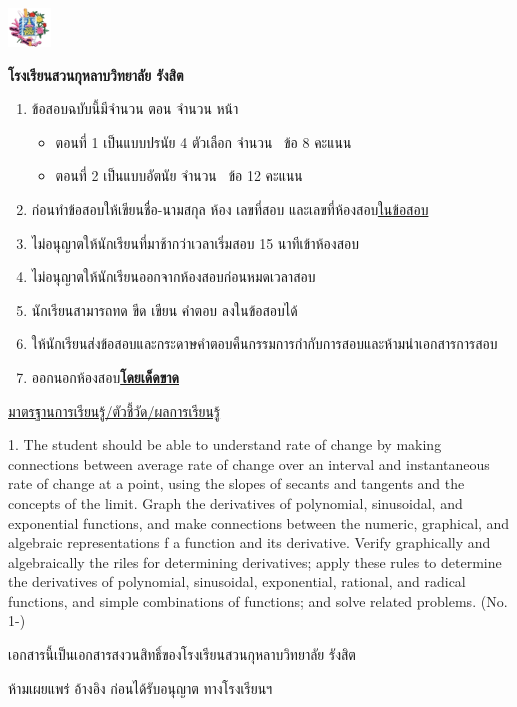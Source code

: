 \documentclass[noquestionbreak, customfontpath=../../Fonts/]{../../skrexam}  %
\newcommand*\SchoolNameTH{\textbf{\Large โรงเรียนสวนกุหลาบวิทยาลัย รังสิต}}
\newcommand*\LearningOutCome{%
1.  The student should be able to understand rate of change by making connections between average rate of change over an interval and instantaneous rate of change at a point, using the slopes of secants and tangents and the concepts of the limit. Graph the derivatives of polynomial, sinusoidal, and exponential functions, and make connections between the numeric, graphical, and algebraic representations f a function and its derivative. Verify graphically and algebraically the riles for determining derivatives; apply these rules to determine the derivatives of polynomial, sinusoidal, exponential, rational, and radical functions, and simple combinations of functions; and solve related problems. (No. 1-\ntotalquestion)
}
\begin{document}
\begin{coverpages}
	\coverpagefont
	\begin{center}
	
	\includegraphics{SKRsmall.png}
	
	\coverpagefont
	
	\SchoolNameTH
	
	\end{center}
	
	\ThaiDescription
		
	\begin{enumerate}
		\item ข้อสอบฉบับนี้มีจำนวน  ตอน  จำนวน  หน้า
		\begin{itemize}
			\item[] ตอนที่ 1 เป็นแบบปรนัย 4 ตัวเลือก จำนวน \nmultiplechoice\ ข้อ 8 คะแนน
			\item[] ตอนที่ 2 เป็นแบบอัตนัย จำนวน \nshortanswer\ ข้อ 12 คะแนน		
		\end{itemize}
		\item ก่อนทำข้อสอบให้เขียนชื่อ-นามสกุล ห้อง เลขที่สอบ และเลขที่ห้องสอบ\underline{ในข้อสอบ}
		\item ไม่อนุญาตให้นักเรียนที่มาช้ากว่าเวลาเริ่มสอบ 15 นาทีเข้าห้องสอบ
		\item ไม่อนุญาตให้นักเรียนออกจากห้องสอบก่อนหมดเวลาสอบ
		\item นักเรียนสามารถทด ขีด เขียน คำตอบ ลงในข้อสอบได้
		\item ให้นักเรียนส่งข้อสอบและกระดาษคำตอบคืนกรรมการกำกับการสอบและห้ามนำเอกสารการสอบ
		\item ออกนอกห้องสอบ\underline{\textbf{โดยเด็ดขาด}}
	\end{enumerate}
	
	
	\asteriskfill
	
	
	\begin{center}
	\underline{มาตรฐานการเรียนรู้/ตัวชี้วัด/ผลการเรียนรู้}
	\end{center}
	
	\LearningOutCome
	

	\asteriskfill
	
	
	\begin{tcolorbox}[halign upper = center]
	
	เอกสารนี้เป็นเอกสารสงวนสิทธิ์ของโรงเรียนสวนกุหลาบวิทยาลัย รังสิต
	
	ห้ามเผยแพร่  อ้างอิง ก่อนได้รับอนุญาต  ทางโรงเรียนฯ 
	\end{tcolorbox}

\end{coverpages}
\end{document}
